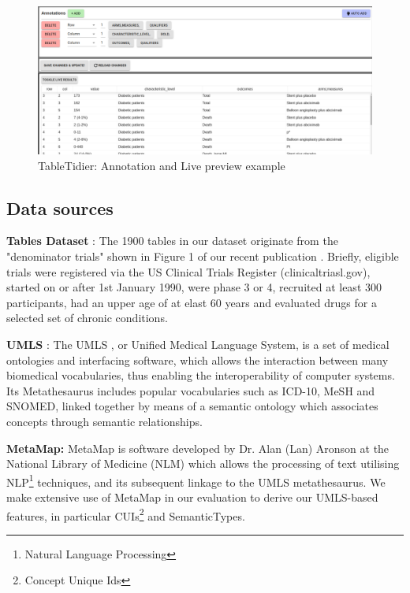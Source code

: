 \documentclass[10.7pt,]{article}
\begin{document}
\begin{figure}
	\centering
	\includegraphics[width=\linewidth]{screenshot004}
	\caption{TableTidier: Annotation and Live preview example}
	\label{fig:annotationPreview}
\end{figure}

\subsection{Data sources}\label{data-sources}
	
	
\textbf{Tables Dataset} : The 1900 tables in our dataset originate from the "denominator trials" shown in Figure 1 of our recent publication \cite{Hanlon2019}. Briefly, eligible trials were registered via the US Clinical Trials Register (clinicaltriasl.gov), started on or after 1st January 1990, were phase 3 or 4, recruited at least 300 participants, had an upper age of at elast 60 years and evaluated drugs for a selected set of chronic conditions.

\textbf{UMLS} : The UMLS \cite{10.1093/nar/gkh061}, or Unified Medical Language System, is a set of medical ontologies and interfacing software, which allows the interaction between many biomedical vocabularies, thus enabling the interoperability of computer systems. Its Metathesaurus includes popular vocabularies such as ICD-10, MeSH and SNOMED, linked together by means of a semantic ontology which associates concepts through semantic relationships.

\textbf{MetaMap: } MetaMap \cite{10.1136/jamia.2009.002733} is software developed by Dr. Alan (Lan) Aronson at the National Library of Medicine (NLM) which allows the processing of text utilising NLP\footnote{Natural Language Processing} techniques, and its subsequent linkage to the UMLS metathesaurus. We make extensive use of MetaMap in our evaluation to derive our UMLS-based features, in particular CUIs\footnote{Concept Unique Ids} and SemanticTypes\cite{semtypes}.
\end{document}
